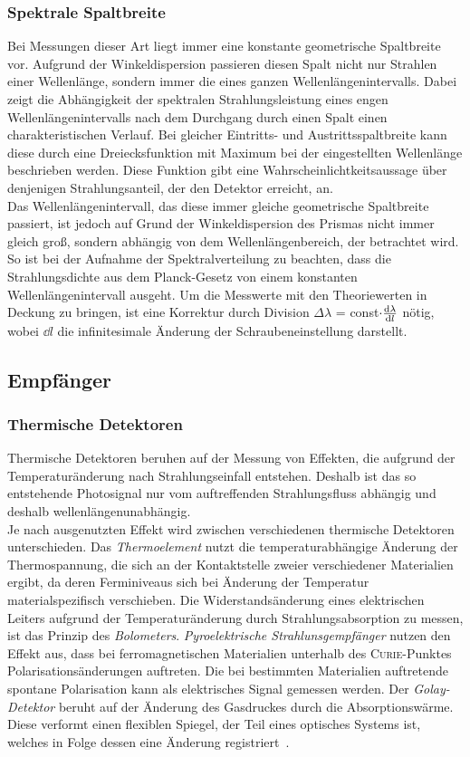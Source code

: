 \documentclass[a4paper,twoside,final]{article}
\begin{document}
\subsubsection{Spektrale Spaltbreite}
Bei Messungen dieser Art liegt immer eine konstante geometrische Spaltbreite vor. Aufgrund der Winkeldispersion passieren diesen Spalt nicht nur Strahlen einer Wellenlänge, sondern immer die eines ganzen Wellenlängenintervalls. Dabei zeigt die Abhängigkeit der spektralen Strahlungsleistung eines engen Wellenlängenintervalls nach dem Durchgang durch einen Spalt einen charakteristischen Verlauf. Bei gleicher Eintritts- und Austrittsspaltbreite kann diese durch eine Dreiecksfunktion mit Maximum bei der eingestellten Wellenlänge beschrieben werden. Diese Funktion gibt eine Wahrscheinlichtkeitsaussage über denjenigen Strahlungsanteil, der den Detektor erreicht, an. \\
Das Wellenlängenintervall, das diese immer gleiche geometrische Spaltbreite passiert, ist jedoch auf Grund der Winkeldispersion des Prismas nicht immer gleich groß, sondern abhängig von dem Wellenlängenbereich, der betrachtet wird. So ist bei der Aufnahme der Spektralverteilung zu beachten, dass die Strahlungsdichte aus dem Planck-Gesetz von einem konstanten Wellenlängenintervall ausgeht. Um die Messwerte mit den Theoriewerten in Deckung zu bringen, ist eine Korrektur durch Division $\Delta \lambda$ = const$\cdot \dv{\lambda}{l}$ nötig, wobei $\dd{l}$ die infinitesimale Änderung der Schraubeneinstellung darstellt.

\subsection{Empfänger}
\subsubsection{Thermische Detektoren}\label{sec:Empfänger}
Thermische Detektoren beruhen auf der Messung von Effekten, die aufgrund der Temperaturänderung nach Strahlungseinfall entstehen. Deshalb ist das so entstehende Photosignal nur vom auftreffenden Strahlungsfluss abhängig und deshalb wellenlängenunabhängig. \\
Je nach ausgenutzten Effekt wird zwischen verschiedenen thermische Detektoren unterschieden. Das \emph{Thermoelement} nutzt die temperaturabhängige Änderung der Thermospannung, die sich an der Kontaktstelle zweier verschiedener Materialien ergibt, da deren Ferminiveaus sich bei Änderung der Temperatur materialspezifisch verschieben.
Die Widerstandsänderung eines elektrischen Leiters aufgrund der Temperaturänderung durch Strahlungsabsorption zu messen, ist das Prinzip des \emph{Bolometers}.
\emph{Pyroelektrische Strahlunsgempfänger} nutzen den Effekt aus, dass bei ferromagnetischen Materialien unterhalb des \textsc{Curie}-Punktes Polarisationsänderungen auftreten. Die bei bestimmten Materialien auftretende spontane Polarisation kann als elektrisches Signal gemessen werden. Der \emph{Golay-Detektor} beruht auf der Änderung des Gasdruckes durch die Absorptionswärme. Diese verformt einen flexiblen Spiegel, der Teil eines optisches Systems ist, welches in Folge dessen eine Änderung registriert~\cite{Gunzler}.
\end{document}
